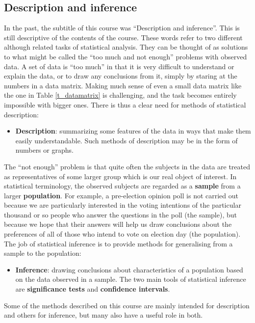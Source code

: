 \subsection{Description and inference}
\label{ss_intro_def_descr}

In the past, the subtitle of this course was ``Description and
inference''. This is still descriptive
of the contents of the course. These words
refer to two different although related tasks of statistical
analysis. They can be thought of as solutions to what might be called
the ``too much and not enough'' problems with observed data. A set of
data is ``too much'' in that it is very difficult to understand or
explain the data,  or to draw any conclusions from it, simply by staring
at the numbers in a data matrix. Making much sense of even a small data
matrix like the one in Table \ref{t_datamatrix} is challenging, and the
task becomes entirely impossible with bigger ones.
There is thus a clear need for methods of statistical
description:
\begin{itemize}
\item
\textbf{Description}: summarizing some features of the data in ways that
make them easily understandable. Such methods of description may be in
the form of numbers or graphs.
\end{itemize}
The ``not enough'' problem is that quite often the subjects in
the data are treated as representatives of some larger group which is
our real object of interest. In statistical terminology, the observed
subjects are regarded as a \textbf{sample} from a larger
\textbf{population}.
For example, a pre-election opinion poll is not carried out because we are
particularly interested in the voting intentions of the particular
thousand or so people who answer the questions in the poll (the sample),
but because we hope that their answers will help us draw
conclusions about the preferences of all of those who intend to
vote on election day (the population). The job of statistical
inference is to provide methods for generalising from a sample to the
population:
\begin{itemize}
\item
\textbf{Inference}: drawing conclusions about characteristics of a
population based on the data observed in a sample. The two main
tools of statistical inference are \textbf{significance tests} and
\textbf{confidence intervals}.
\end{itemize}
Some of the methods described on this course are mainly intended for
description and others for inference, but many also have a useful
role in both.

